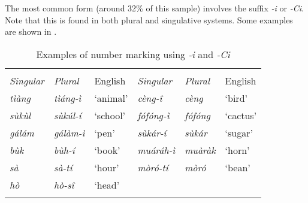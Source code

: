 \documentclass[output=paper]{langsci/langscibook}
\begin{document}
\begin{table}
\caption{Patterns for singular and plural formation}
\label{tab:moodie:9}
\end{table}

The most common form (around 32\% of this sample) involves the suffix \textit{-i} or \textit{-Ci}. Note that this is found in both plural and singulative systems. Some examples are shown in .  

\begin{table}
\begin{tabularx}{\textwidth}{>{\itshape}X>{\itshape}XX>{\itshape}X>{\itshape}XX}
\lsptoprule

\multicolumn{3}{c}{ \textup{Plurative}} & \multicolumn{3}{c}{ \textup{Singulative}}\\ \cmidrule(lr){1-3}\cmidrule(lr){4-6}
 \textup{Singular} & \textup{Plural} & {English} & \textup{Singular} & \textup{Plural} & {English}\\ \midrule
 tìàng &  tìáng-ì & ‘animal’ &  cèng-î &  cèng & ‘bird’\\
 sùkùl &  sùkúl-í & ‘school’ &  fófóng-ì &  fófóng & ‘cactus’\\
 gálám &  gálàm-ì & ‘pen’ &  sùkár-í &  sùkár & ‘sugar’\\
 bùk &  bùh-í & ‘book’ &  muáráh-ì &  muàràk & ‘horn’\\
 sà &  sà-tí & ‘hour’ &  mòró-tí &  mòró & ‘bean’\\
 hò &  hò-sî & ‘head’ &  &  & \\
\lspbottomrule
\end{tabularx}
\caption{Examples of number marking using \textit{-i} and \textit{-Ci}}
\label{tab:moodie:10}
\end{table}
\end{document}
